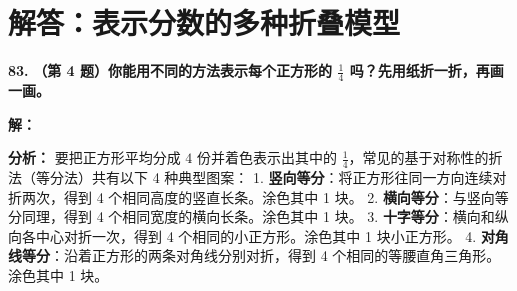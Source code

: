\documentclass[12pt, a4paper]{ctexrep}
\begin{document}
\newpage

\section{解答：表示分数的多种折叠模型}

\vspace{0.6cm}

\textbf{\LARGE 83.} \textbf{（第 4 题）你能用不同的方法表示每个正方形的 $\displaystyle\frac{1}{4}$ 吗？先用纸折一折，再画一画。}

\vspace{0.4cm}
\textbf{解：}

\textbf{分析：}
要把正方形平均分成 $4$ 份并着色表示出其中的 $\displaystyle\frac{1}{4}$，常见的基于对称性的折法（等分法）共有以下 4 种典型图案：
1. \textbf{竖向等分}：将正方形往同一方向连续对折两次，得到 4 个相同高度的竖直长条。涂色其中 1 块。
2. \textbf{横向等分}：与竖向等分同理，得到 4 个相同宽度的横向长条。涂色其中 1 块。
3. \textbf{十字等分}：横向和纵向各中心对折一次，得到 4 个相同的小正方形。涂色其中 1 块小正方形。
4. \textbf{对角线等分}：沿着正方形的两条对角线分别对折，得到 4 个相同的等腰直角三角形。涂色其中 1 块。
\end{document}
